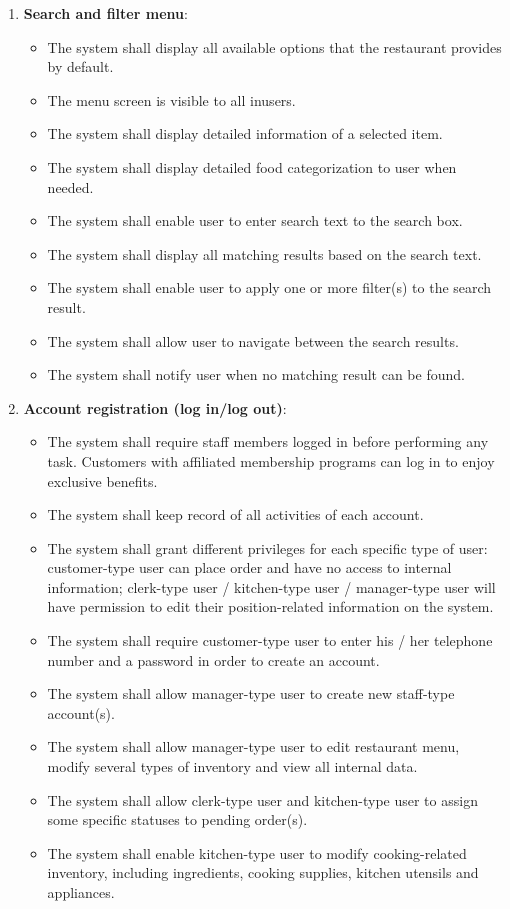 \documentclass[12pt, a4paper]{article}
\theoremstyle{styleth}
\theoremstyle{styledef}
\begin{document}
\begin{enumerate}[label=\alph*., font=\itshape]
	\item \textbf{Search and filter menu}:
	\begin{itemize}
		\item The system shall display all available options that the restaurant provides by default.
		\item The menu screen is visible to all inusers.
		\item The system shall display detailed information of a selected item.
		\item The system shall display detailed food categorization to user when
		needed.
		\item The system shall enable user to enter search text to the search box.
		\item The system shall display all matching results based on the search text.
		\item The system shall enable user to apply one or more filter(s) to the search
		result.
		\item The system shall allow user to navigate between the search results.
		\item The system shall notify user when no matching result can be found.
	\end{itemize}

	\item \textbf{Account registration (log in/log out)}:
	\begin{itemize}
		\item The system shall require staff members logged in before performing any task. Customers with affiliated membership programs can log in to enjoy exclusive benefits.
		\item The system shall keep record of all activities of each account.
		\item The system shall grant different privileges for each specific type of user: customer-type user can place order and have no access to internal information; clerk-type user / kitchen-type user / manager-type user will have permission to edit their position-related information on the system.
		\item The system shall require customer-type user to enter his / her telephone number and a password in order to create an account.
		\item The system shall allow manager-type user to create new staff-type account(s).
		\item The system shall allow manager-type user to edit restaurant menu, modify	several types of inventory and view all internal data.
		\item The system shall allow clerk-type user and kitchen-type user to assign some specific statuses to pending order(s).
		\item The system shall enable kitchen-type user to modify cooking-related inventory, including ingredients, cooking supplies, kitchen utensils and appliances.
	\end{itemize}
	

\end{enumerate}
\end{document}
